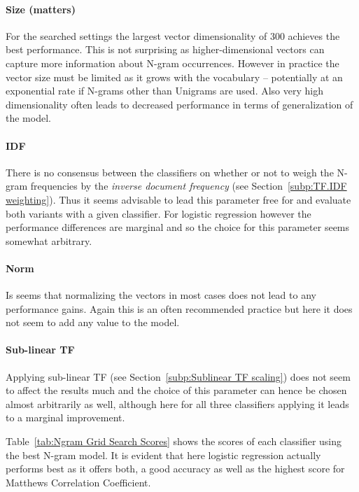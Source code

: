 \paragraph{Size (matters)}
\label{par:Size}
For the searched settings the largest vector dimensionality of 300 achieves the best performance. This is not surprising as higher-dimensional vectors can capture more information about N-gram occurrences. However in practice the vector size must be limited as it grows with the vocabulary -- potentially at an exponential rate if N-grams other than Unigrams are used. Also very high dimensionality often leads to decreased performance in terms of generalization of the model.

\paragraph{IDF}
\label{par:IDF}
There is no consensus between the classifiers on whether or not to weigh the N-gram frequencies by the \emph{inverse document frequency} (see Section~\ref{subp:TF.IDF weighting}). Thus it seems advisable to lead this parameter free for and evaluate both variants with a given classifier. For logistic regression however the performance differences are marginal and so the choice for this parameter seems somewhat arbitrary.

\paragraph{Norm}
\label{par:Norm}
Is seems that normalizing the vectors in most cases does not lead to any performance gains. Again this is an often recommended practice but here it does not seem to add any value to the model.


\paragraph{Sub-linear TF}
\label{par:Sub-linear TF}
Applying sub-linear TF (see Section~\ref{subp:Sublinear TF scaling}) does not seem to affect the results much and the choice of this parameter can hence be chosen almost arbitrarily as well, although here for all three classifiers applying it leads to a marginal improvement.

Table~\ref{tab:Ngram Grid Search Scores} shows the scores of each classifier using the best N-gram model. It is evident that here logistic regression actually performs best as it offers both, a good accuracy as well as the highest score for Matthews Correlation Coefficient.

